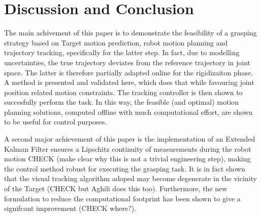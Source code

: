 \section{Discussion and Conclusion}
\label{sec:disc}
%
The main achivement of this paper is to demonstrate the feasibility of a grasping strategy based on Target motion prediction, robot motion planning and trajectory tracking, specifically for the latter step. In fact, due to modelling uncertainties, the true trajectory deviates from the reference trajectory in joint space. The latter is therefore partially adapted online for the rigidizaiton phase. A method is presented and validated here, which does that while favouring joint position related motion constraints. The tracking controller is then shown to succesfully perform the task. In this way, the feasible (and optimal) motion planning solutions,   computed offline with much computational effort, are shown to be useful for control purposes. %
%

A second major achievement of this paper is the implementation of an Extended Kalman Filter  ensures a Lipschitz continuity of measurements during the robot motion CHECK (make clear why this is not a trivial engineering step), making the control method robust for executing the grasping task. It is in fact shown that the visual tracking algorithm adoped may become degenerate in the vicinity of the Target (CHECK but Aghili does this too). Furthermore, the new formulation to reduce the computational footprint has been shown to give a signifcant improvement (CHECK where?). %

